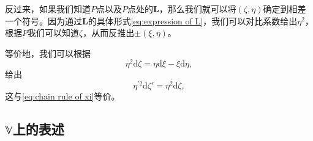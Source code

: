 反过来，如果我们知道$P$点以及$P$点处的$\mathbf{L}$，那么我们就可以将$( \zeta ,\eta )$确定到相差一个符号。因为通过$\mathbf{L}$的具体形式\ref{eq:expression of L}，我们可以对比系数给出$\eta ^{2}$，根据$P$我们可以知道$\zeta $，从而反推出$\pm ( \xi ,\eta )$。



等价地，我们可以根据
\begin{equation*}
	\eta ^{2}\mathrm{d} \zeta =\eta \mathrm{d} \xi -\xi \mathrm{d} \eta ,
\end{equation*}
给出
\begin{equation*}
	\eta ^{\prime 2}\mathrm{d} \zeta '=\eta ^{2}\mathrm{d} \zeta ,
\end{equation*}
这与\ref{eq:chain rule of xi}等价。


\subsection{$\mathbb{V}$上的表述}

